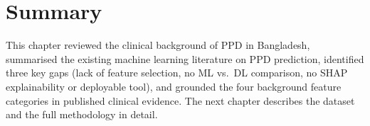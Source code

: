 \section{Summary}

This chapter reviewed the clinical background of PPD in Bangladesh, summarised the existing machine learning literature on PPD prediction, identified three key gaps (lack of feature selection, no ML vs.\ DL comparison, no SHAP explainability or deployable tool), and grounded the four background feature categories in published clinical evidence. The next chapter describes the dataset and the full methodology in detail.
